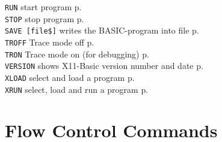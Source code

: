 \begin{tabbing}
\verb|RUN|	    \> start program                    \> p.\pageref{RUN}\\
\verb|STOP|         \> stop program            \> p.\pageref{STOP}\\
\verb|SAVE [file$]| \> writes the BASIC-program into file\> p.\pageref{SAVE}\\
\verb|TROFF|        \> Trace mode off                    \> p.\pageref{TROFF}\\
\verb|TRON|         \> Trace mode on  (for debugging)    \> p.\pageref{TRON}\\
\verb|VERSION| 	    \> shows X11-Basic version number and date\> p.\pageref{VERSION}\\
\verb|XLOAD|	    \> select and load a program         \> p.\pageref{XLOAD}\\
\verb|XRUN|	    \> select, load and run a program    \> p.\pageref{XRUN}\\
 \end{tabbing}

\section{Flow Control Commands}

